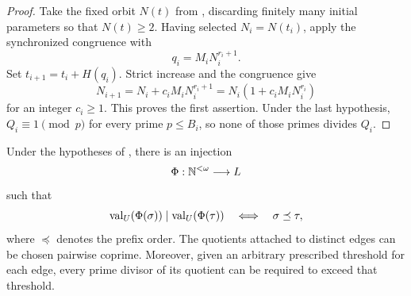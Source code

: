 \begin{proof}
  Take the fixed orbit \(N(t)\) from
  , discarding finitely many
  initial parameters so that \(N(t)\ge2\). Having selected
  \(N_i=N(t_i)\), apply the synchronized congruence with
  \[
    q_i=M_iN_i^{r_i+1}.
  \]
  Set \(t_{i+1}=t_i+H(q_i)\). Strict increase and the congruence give
  \[
    N_{i+1}=N_i+c_iM_iN_i^{r_i+1}
           =N_i(1+c_iM_iN_i^{r_i})
  \]
  for an integer \(c_i\ge1\). This proves the first assertion. Under
  the last hypothesis, \(Q_i\equiv1\pmod p\) for every prime
  \(p\le B_i\), so none of those primes divides \(Q_i\).
\end{proof}

\begin{theorem}
  \label{thm:unit-mcfl-divisibility-tree}
  Under the hypotheses of
  , there is an injection
  \[
    \Phi:\mathbb{N}^{<\omega}\longrightarrow L
  \]
  such that
  \[
    \operatorname{val}_U(\Phi(\sigma))\mid\operatorname{val}_U(\Phi(\tau))
      \quad\Longleftrightarrow\quad \sigma\preceq\tau,
  \]
  where \(\preceq\) denotes the prefix order. The quotients attached to
  distinct edges can be chosen pairwise coprime. Moreover, given an
  arbitrary prescribed threshold for each edge, every prime divisor of
  its quotient can be required to exceed that threshold.
\end{theorem}


